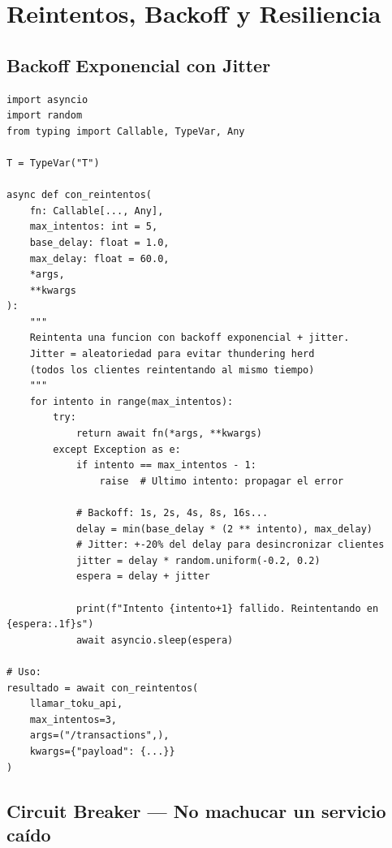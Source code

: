 \documentclass[11pt,a4paper]{article}
\begin{document}
\section{Reintentos, Backoff y Resiliencia}

\subsection{Backoff Exponencial con Jitter}

\begin{lstlisting}[style=python]
import asyncio
import random
from typing import Callable, TypeVar, Any

T = TypeVar("T")

async def con_reintentos(
    fn: Callable[..., Any],
    max_intentos: int = 5,
    base_delay: float = 1.0,
    max_delay: float = 60.0,
    *args,
    **kwargs
):
    """
    Reintenta una funcion con backoff exponencial + jitter.
    Jitter = aleatoriedad para evitar thundering herd
    (todos los clientes reintentando al mismo tiempo)
    """
    for intento in range(max_intentos):
        try:
            return await fn(*args, **kwargs)
        except Exception as e:
            if intento == max_intentos - 1:
                raise  # Ultimo intento: propagar el error

            # Backoff: 1s, 2s, 4s, 8s, 16s...
            delay = min(base_delay * (2 ** intento), max_delay)
            # Jitter: +-20% del delay para desincronizar clientes
            jitter = delay * random.uniform(-0.2, 0.2)
            espera = delay + jitter

            print(f"Intento {intento+1} fallido. Reintentando en {espera:.1f}s")
            await asyncio.sleep(espera)

# Uso:
resultado = await con_reintentos(
    llamar_toku_api,
    max_intentos=3,
    args=("/transactions",),
    kwargs={"payload": {...}}
)
\end{lstlisting}

\subsection{Circuit Breaker — No machucar un servicio caído}
\end{document}
